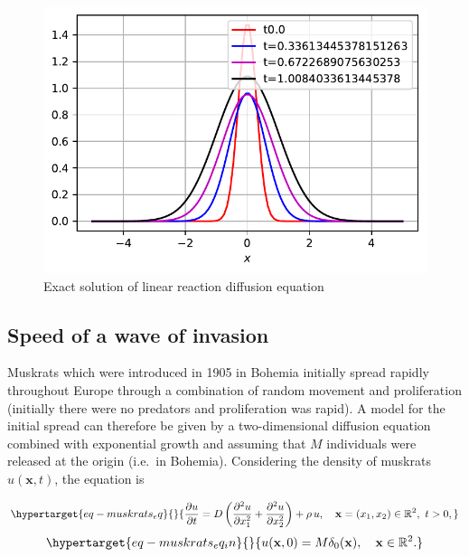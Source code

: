 \documentclass[
  letterpaper,
  DIV=11,
  numbers=noendperiod]{scrreprt}
\theoremstyle{plain}
\theoremstyle{definition}
\theoremstyle{plain}
\theoremstyle{remark}
\begin{document}
\begin{figure}

{\centering \includegraphics{linearreactiondiffusion_files/figure-pdf/fig-diffusionlinearsource-output-2.pdf}

}

\caption{\label{fig-diffusionlinearsource}Exact solution of linear
reaction diffusion equation}

\end{figure}

\hypertarget{speed-of-a-wave-of-invasion}{%
\subsection{Speed of a wave of
invasion}\label{speed-of-a-wave-of-invasion}}

Muskrats which were introduced in 1905 in Bohemia initially spread
rapidly throughout Europe through a combination of random movement and
proliferation (initially there were no predators and proliferation was
rapid). A model for the initial spread can therefore be given by a
two-dimensional diffusion equation combined with exponential growth and
assuming that \(M\) individuals were released at the origin (i.e.~in
Bohemia). Considering the density of muskrats \(u({\mathbf{x}} , t)\),
the equation is

\begin{equation}\protect\hypertarget{eq-muskrats_eq}{}{
\frac{\partial u}{\partial t} = D \left(\frac{\partial^2 u}{\partial x_1^2} +  \frac{\partial^2 u}{\partial x_2^2}\right)  + \rho \, u, \quad {\mathbf{x}} = (x_1 , x_2) \in \mathbb R^2, \, \, t >0, 
}\label{eq-muskrats_eq}\end{equation}
\begin{equation}\protect\hypertarget{eq-muskrats_eq_in}{}{
u({\mathbf{x}}, 0) = M \delta_0({\mathbf{x}}), \quad {\mathbf{x}} \in \mathbb R^2.
}\label{eq-muskrats_eq_in}\end{equation}
\end{document}
